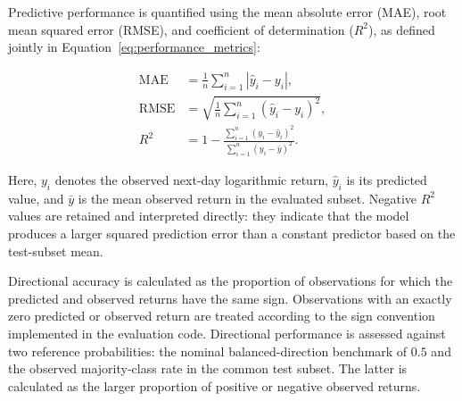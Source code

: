 \documentclass[utf8]{FrontiersinHarvard} %
\begin{document}
Predictive performance is quantified using the mean absolute error (MAE), root mean squared error (RMSE), and coefficient of determination (\(R^2\)), as defined jointly in Equation~\ref{eq:performance_metrics}:

\begin{equation}
	\begin{aligned}
		\mathrm{MAE}
		&=
		\frac{1}{n}
		\sum_{i=1}^{n}
		\left|\hat{y}_i-y_i\right|, \\
		\mathrm{RMSE}
		&=
		\sqrt{
			\frac{1}{n}
			\sum_{i=1}^{n}
			\left(\hat{y}_i-y_i\right)^2
		}, \\
		R^2
		&=
		1-
		\frac{
			\sum_{i=1}^{n}
			\left(y_i-\hat{y}_i\right)^2
		}{
			\sum_{i=1}^{n}
			\left(y_i-\bar{y}\right)^2
		}.
	\end{aligned}
	\label{eq:performance_metrics}
\end{equation}

Here, \(y_i\) denotes the observed next-day logarithmic return, \(\hat{y}_i\) is its predicted value, and \(\bar{y}\) is the mean observed return in the evaluated subset. Negative \(R^2\) values are retained and interpreted directly: they indicate that the model produces a larger squared prediction error than a constant predictor based on the test-subset mean.

Directional accuracy is calculated as the proportion of observations for which the predicted and observed returns have the same sign. Observations with an exactly zero predicted or observed return are treated according to the sign convention implemented in the evaluation code. Directional performance is assessed against two reference probabilities: the nominal balanced-direction benchmark of \(0.5\) and the observed majority-class rate in the common test subset. The latter is calculated as the larger proportion of positive or negative observed returns.
\end{document}
